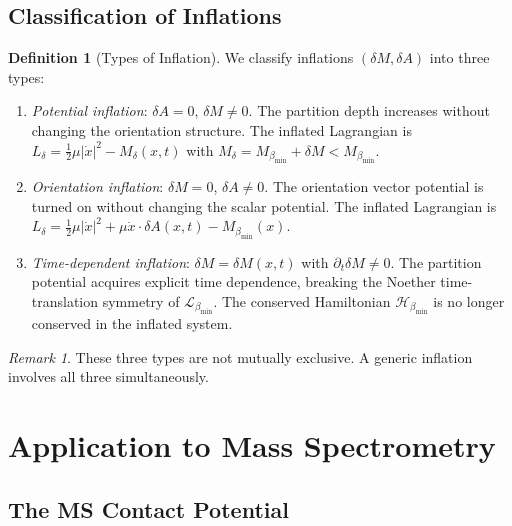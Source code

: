 \documentclass[12pt, a4paper]{article}
\theoremstyle{plain}
\theoremstyle{definition}
\newtheorem{definition}[theorem]{Definition}
\theoremstyle{remark}
\newtheorem{remark}[theorem]{Remark}
\newcommand{\bmin}{\beta_{\min}}
\newcommand{\Lmin}{\mathcal{L}_{\bmin}}
\newcommand{\Hmin}{\mathcal{H}_{\bmin}}
\newcommand{\half}{\tfrac{1}{2}}
\begin{document}
\subsection{Classification of Inflations}

\begin{definition}[Types of Inflation]
\label{def:inflation_types}
We classify inflations $(\delta M, \delta A)$ into three types:
\begin{enumerate}[label=(\roman*)]
  \item \emph{Potential inflation}: $\delta A = 0$, $\delta M \neq 0$. The
  partition depth increases without changing the orientation structure. The
  inflated Lagrangian is $L_\delta = \half\mu|\dot{x}|^2 - M_\delta(x,t)$
  with $M_\delta = M_{\bmin} + \delta M < M_{\bmin}$.

  \item \emph{Orientation inflation}: $\delta M = 0$, $\delta A \neq 0$. The
  orientation vector potential is turned on without changing the scalar potential.
  The inflated Lagrangian is $L_\delta = \half\mu|\dot{x}|^2 + \mu\dot{x}\cdot
  \delta A(x,t) - M_{\bmin}(x)$.

  \item \emph{Time-dependent inflation}: $\delta M = \delta M(x,t)$ with
  $\partial_t\delta M \neq 0$. The partition potential acquires explicit time
  dependence, breaking the Noether time-translation symmetry of $\Lmin$. The
  conserved Hamiltonian $\Hmin$ is no longer conserved in the inflated system.
\end{enumerate}
\end{definition}

\begin{remark}
These three types are not mutually exclusive. A generic inflation involves all
three simultaneously.
\end{remark}

\section{Application to Mass Spectrometry}
\label{sec:ms}

\subsection{The MS Contact Potential}
\end{document}
